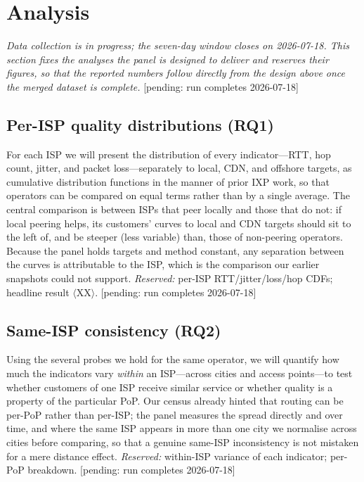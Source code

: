 \documentclass[conference]{IEEEtran}
\newcommand{\pending}{{\color{gray}\small[pending: run completes 2026-07-18]}}
\newcommand{\XX}{{\color{gray}$\langle$XX$\rangle$}} %
\begin{document}
\section{Analysis}
\label{sec:analysis}
\emph{Data collection is in progress; the seven-day window closes on 2026-07-18. This section fixes
the analyses the panel is designed to deliver and reserves their figures, so that the reported
numbers follow directly from the design above once the merged dataset is complete.} \pending

\subsection{Per-ISP quality distributions (RQ1)}
For each ISP we will present the distribution of every indicator---RTT, hop count, jitter, and
packet loss---separately to local, CDN, and offshore targets, as cumulative distribution functions
in the manner of prior IXP work, so that operators can be compared on equal terms rather than by a
single average. The central comparison is between ISPs that peer locally and those that do not: if
local peering helps, its customers' curves to local and CDN targets should sit to the left of, and
be steeper (less variable) than, those of non-peering operators. Because the panel holds targets and
method constant, any separation between the curves is attributable to the ISP, which is the
comparison our earlier snapshots could not support.
\emph{Reserved:} per-ISP RTT/jitter/loss/hop CDFs; headline result \XX. \pending

\subsection{Same-ISP consistency (RQ2)}
Using the several probes we hold for the same operator, we will quantify how much the indicators
vary \emph{within} an ISP---across cities and access points---to test whether customers of one ISP
receive similar service or whether quality is a property of the particular PoP. Our census already
hinted that routing can be per-PoP rather than per-ISP; the panel measures the spread directly and
over time, and where the same ISP appears in more than one city we normalise across cities before
comparing, so that a genuine same-ISP inconsistency is not mistaken for a mere distance effect.
\emph{Reserved:} within-ISP variance of each indicator; per-PoP breakdown. \pending
\end{document}
